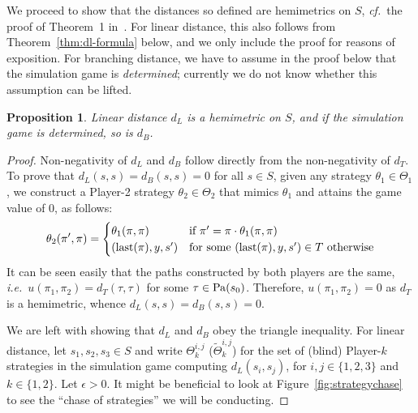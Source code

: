 \documentclass[copyright,creativecommons,sharealike]{eptcs}
\theoremstyle{plain}
\newtheorem{proposition}[theorem]{Proposition}
\newcommand*\Strat{\Theta}
\newcommand*\Stratblind{\tilde \Strat}
\newcommand*\stratA{\Strat_1}
\newcommand*\stratB{\Strat_2}
\newcommand*\ie{\textit{i.e.}}
\newcommand*\cf{\textit{cf.}}
\newcommand*\last{\textup{last}} \newcommand{\Round}[1]{\ensuremath{\textup{Round}_{(#1)}}\xspace}
\begin{document}
We proceed to show that the distances so defined are hemimetrics on
$S$, \cf~the proof of Theorem~1 in~\cite{conf/concur/CernyHR10}.
For linear distance, this also follows from
Theorem~\ref{thm:dl-formula} below, and we only include the proof for
reasons of exposition.  For branching distance, we have to assume in
the proof below that the simulation game is \emph{determined};
currently we do not know whether this assumption can be lifted.

\begin{proposition}
  \label{prop:hemi}
  Linear distance $d_L$ is a hemimetric on $S$, and if the simulation
  game is determined, so is $d_B$.
\end{proposition}

\begin{proof}
  Non-negativity of $d_L$ and $d_B$ follow directly from the
  non-negativity of $d_T$.  To prove that $d_L(s,s) = d_B(s,s) = 0$
  for all $s \in S$, given any strategy $\theta_1 \in \stratA$, we
  construct a Player-2 strategy $\theta_2 \in \stratB$ that mimics
  $\theta_1$ and attains the game value of $0$, as follows:
  \begin{equation*}
    \theta_2(\pi',\pi) =
    \begin{cases}
      \theta_1(\pi,\pi) &\text{if } \pi' = \pi \cdot \theta_1(\pi,\pi)
      \\
      (\last(\pi),y,s') &\text{for some } (\last(\pi),y,s') \in T
      \text{ otherwise}
    \end{cases}
  \end{equation*}
  It can be seen easily that the paths constructed by both players are
  the same, \ie~$u(\pi_1,\pi_2) = d_T(\tau,\tau)$ for some $\tau \in
  \operatorname{Pa}(s_0)$. Therefore, $u(\pi_1,\pi_2) = 0$ as $d_T$ is a hemimetric,
  whence $d_L(s,s) = d_B(s,s) = 0$.

  We are left with showing that $d_L$ and $d_B$ obey the triangle
  inequality.  For linear distance, let $s_1, s_2, s_3\in S$ and write
  $\Strat_k^{ i, j}$ ($\Stratblind_k^{ i, j}$) for the set of (blind)
  Player-$k$ strategies in the simulation game computing $d_L( s_i,
  s_j)$, for $i, j\in\{ 1, 2, 3\}$ and $k\in\{ 1, 2\}$.  Let
  $\epsilon> 0$.
  It might be beneficial to look at Figure~\ref{fig:strategychase} to
  see the ``chase of strategies'' we will be conducting.


\end{proof}
\end{document}
